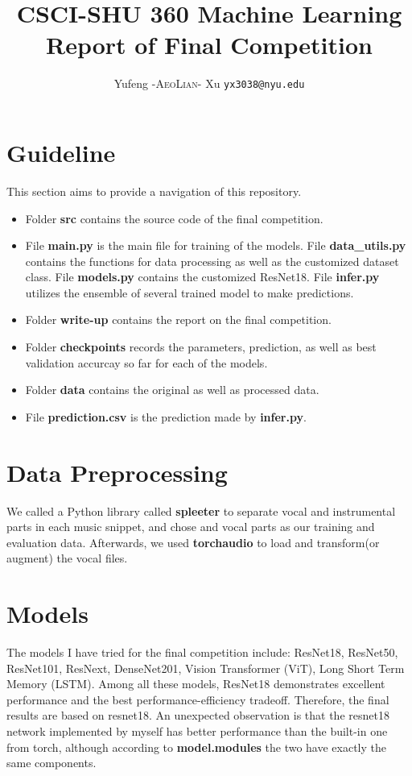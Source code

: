 \documentclass{article}
\title{CSCI-SHU 360 Machine Learning\\
    Report of Final Competition}
\author{Yufeng \textsc{-AeoLian-} Xu  \texttt{yx3038@nyu.edu}}
\begin{document}
    \maketitle

    \section{Guideline}
    This section aims to provide a navigation of this repository. 
    \begin{itemize}
        \item Folder \textbf{src} contains the source code of the final competition.
        \item File \textbf{main.py} is the main file for training of the models. File \textbf{data\_utils.py} contains the functions for data processing as well as the customized dataset class. File \textbf{models.py} contains the customized ResNet18. File \textbf{infer.py} utilizes the ensemble of several trained model to make predictions.
        \item Folder \textbf{write-up} contains the report on the final competition.
        \item Folder \textbf{checkpoints} records the parameters, prediction, as well as best validation accurcay so far for each of the models.
        \item Folder \textbf{data} contains the original as well as processed data.
        \item File \textbf{prediction.csv} is the prediction made by \textbf{infer.py}.
    \end{itemize}

    \section{Data Preprocessing}
    We called a Python library called \textbf{spleeter} to separate vocal and instrumental parts in each music snippet, and chose and vocal parts as our training and evaluation  data. Afterwards, we used \textbf{torchaudio} to load and transform(or augment) the vocal files.

    \section{Models}
    The models I have tried for the final competition include: ResNet18, ResNet50, ResNet101, ResNext, DenseNet201, Vision Transformer (ViT), Long Short Term Memory (LSTM).
    Among all these models, ResNet18 demonstrates excellent performance and the best performance-efficiency tradeoff. Therefore, the final results are based on resnet18. An unexpected observation is that the resnet18 network implemented by myself has better performance than the built-in one from torch, although according to \textbf{model.modules} the two have exactly the same components.
\end{document}

